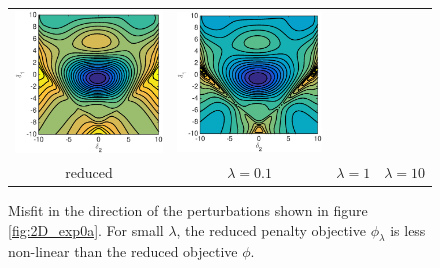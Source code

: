 \documentclass{iopart}
\begin{document}
\begin{figure}
\begin{tabular}{cccc}
\includegraphics[scale=.2]{./figs/2D_exp0_k}&
\includegraphics[scale=.2]{./figs/2D_exp0_l}\\
{\small reduced}&{\small $\lambda=0.1$}&{\small $\lambda=1$}&{\small $\lambda=10$}\\
\end{tabular}
\caption{Misfit in the direction of the perturbations shown in figure \ref{fig:2D_exp0a}. For small $\lambda$, the reduced penalty objective $\phi_{\lambda}$ is less non-linear than the reduced objective $\phi$.}
\label{fig:2D_exp0b}
\end{figure}
\end{document}
